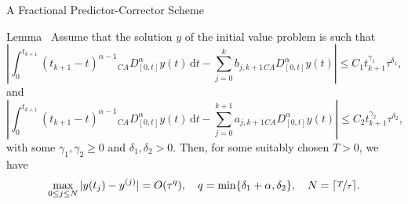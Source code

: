 \documentclass[aspectratio=169,xcolor=dvipsnames]{beamer}
\begin{document}
\begin{frame}{A Fractional Predictor-Corrector Scheme}

\begin{alertblock}{Lemma~\parencite[Lemma~3.1]{FractionalAdamsMethodsAnalysis}}
Assume that the solution $y$ of the initial value problem is such that
\[
\left\lvert \int_{0}^{t_{k+1}} (t_{k+1}-t)^{\alpha-1} {}_{CA}D_{[0,t]}^\alpha y(t) \, \textrm{d}t - \sum_{j=0}^{k} b_{j,k+1} {}_{CA}D_{[0,t]}^\alpha y(t)  \right\rvert \leq C_1 t_{k+1}^{\gamma_1} \tau^{\delta_1},
\]
and
\[
\left\lvert \int_{0}^{t_{k+1}} (t_{k+1}-t)^{\alpha-1} {}_{CA}D_{[0,t]}^\alpha y(t) \, \textrm{d}t - \sum_{j=0}^{k+1} a_{j,k+1} {}_{CA}D_{[0,t]}^\alpha y(t)  \right\rvert \leq C_2 t_{k+1}^{\gamma_2} \tau^{\delta_2},
\]
with some $\gamma_1,\gamma_2 \geq 0$ and $\delta_1,\delta_2 > 0$. Then, for some suitably chosen $T > 0$, we have
\[
\max_{0 \leq j \leq N} |y(t_j) - y^{(j)}| = O(\tau^q), \quad q = \min\{\delta_1+\alpha,\delta_2\}, \quad N = \lceil \nicefrac{T}{\tau} \rceil.
\]
\end{alertblock}

\end{frame}
\end{document}
